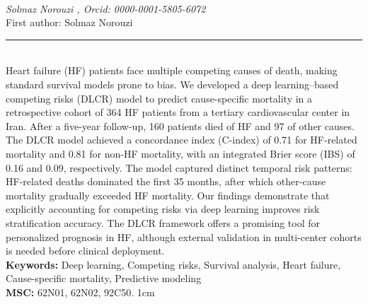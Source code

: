 \documentclass[10pt,twoside]{article}
\begin{document}
\noindent\begin{minipage}[t][\textheight]{\textwidth}
\\[0.35em]
{\itshape Solmaz Norouzi , Orcid: 0000-0001-5805-6072}\\[0.2em]
{\footnotesize First author: Solmaz Norouzi}\\[0.45em]
\noindent\rule{\textwidth}{0.3pt}\\[0.4em]
{\footnotesize  Heart failure (HF) patients face multiple competing causes of death, making standard survival models prone to bias. We developed a deep learning--based competing risks (DLCR) model to predict cause-specific mortality in a retrospective cohort of 364 HF patients from a tertiary cardiovascular center in Iran. After a five-year follow-up, 160 patients died of HF and 97 of other causes. The DLCR model achieved a concordance index (C-index) of 0.71 for HF-related mortality and 0.81 for non-HF mortality, with an integrated Brier score (IBS) of 0.16 and 0.09, respectively. The model captured distinct temporal risk patterns: HF-related deaths dominated the first 35 months, after which other-cause mortality gradually exceeded HF mortality. Our findings demonstrate that explicitly accounting for competing risks via deep learning improves risk stratification accuracy. The DLCR framework offers a promising tool for personalized prognosis in HF, although external validation in multi-center cohorts is needed before clinical deployment.}\\[0.4em]
{\footnotesize\bfseries Keywords:} {\footnotesize Deep learning, Competing risks, Survival analysis, Heart failure, Cause-specific mortality, Predictive modeling}\\[0.15em]
{\footnotesize\bfseries MSC:} {\footnotesize 62N01, 62N02, 92C50. 1cm}\\
\vfill
\end{minipage}
\newpage
\end{document}
